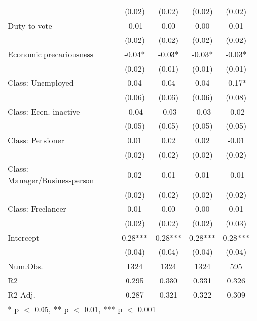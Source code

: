 \begin{table}
\begin{tabular}[t]{lcccc}
 & (0.02) & (0.02) & (0.02) & \vphantom{3} (0.02)\\
Duty to vote & -0.01 & 0.00 & 0.00 & 0.01\\
 & (0.02) & (0.02) & (0.02) & \vphantom{2} (0.02)\\
Economic  precariousness & -0.04* & -0.03* & -0.03* & -0.03*\\
 & (0.02) & (0.01) & (0.01) & (0.01)\\
Class: Unemployed & 0.04 & 0.04 & 0.04 & -0.17*\\
 & (0.06) & (0.06) & (0.06) & (0.08)\\
Class: Econ. inactive & -0.04 & -0.03 & -0.03 & -0.02\\
 & (0.05) & (0.05) & (0.05) & (0.05)\\
Class: Pensioner & 0.01 & 0.02 & 0.02 & -0.01\\
 & (0.02) & (0.02) & (0.02) & \vphantom{1} (0.02)\\
Class: Manager/Businessperson & 0.02 & 0.01 & 0.01 & -0.01\\
 & (0.02) & (0.02) & (0.02) & (0.02)\\
Class: Freelancer & 0.01 & 0.00 & 0.00 & 0.01\\
 & (0.02) & (0.02) & (0.02) & (0.03)\\
Intercept & 0.28*** & 0.28*** & 0.28*** & 0.28***\\
 & (0.04) & (0.04) & (0.04) & (0.04)\\
\midrule
Num.Obs. & 1324 & 1324 & 1324 & 595\\
R2 & 0.295 & 0.330 & 0.331 & 0.326\\
R2 Adj. & 0.287 & 0.321 & 0.322 & 0.309\\
\bottomrule
\multicolumn{5}{l}{\rule{0pt}{1em}* p $<$ 0.05, ** p $<$ 0.01, *** p $<$ 0.001}\\
\end{tabular}
\end{table}
